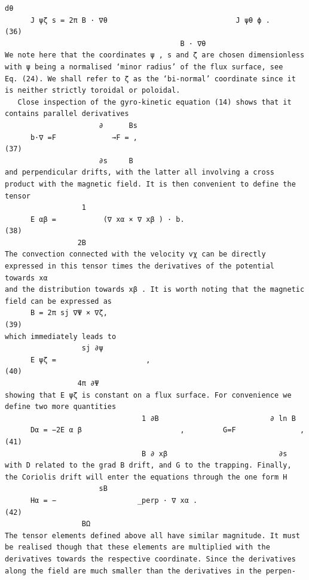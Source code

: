 \documentclass[a4paper]{article}
\newcommand{\gkwpagefont}{\fontsize{6.0pt}{7.55pt}\selectfont}
\begin{document}
\begin{Verbatim}[fontsize=\gkwpagefont]
                                              dθ
      J ψζ s = 2π B · ∇θ                              J ψθ ϕ .                                                                                 (36)
                                         B · ∇θ
We note here that the coordinates ψ , s and ζ are chosen dimensionless with ψ being a normalised ‘minor radius’ of the flux surface, see
Eq. (24). We shall refer to ζ as the ‘bi-normal’ coordinate since it is neither strictly toroidal or poloidal.
   Close inspection of the gyro-kinetic equation (14) shows that it contains parallel derivatives
                      ∂      Bs
      b·∇ =F             →F = ,                                                                                                                (37)
                      ∂s     B
and perpendicular drifts, with the latter all involving a cross product with the magnetic field. It is then convenient to define the tensor
                  1
      E αβ =           (∇ xα × ∇ xβ ) · b.                                                                                                     (38)
                 2B
The convection connected with the velocity vχ can be directly expressed in this tensor times the derivatives of the potential towards xα
and the distribution towards xβ . It is worth noting that the magnetic field can be expressed as
      B = 2π sj ∇Ψ × ∇ζ,                                                                                                                       (39)
which immediately leads to
                  sj ∂ψ
      E ψζ =                     ,                                                                                                             (40)
                 4π ∂Ψ
showing that E ψζ is constant on a flux surface. For convenience we define two more quantities
                                1 ∂B                          ∂ ln B
      Dα = −2E α β                       ,         G=F               ,                                                                         (41)
                                B ∂ xβ                          ∂s
with D related to the grad B drift, and G to the trapping. Finally, the Coriolis drift will enter the equations through the one form H
                      sB
      Hα = −                   _perp · ∇ xα .                                                                                                     (42)
                  BΩ
The tensor elements defined above all have similar magnitude. It must be realised though that these elements are multiplied with the
derivatives towards the respective coordinate. Since the derivatives along the field are much smaller than the derivatives in the perpen-

\end{Verbatim}
\end{document}
